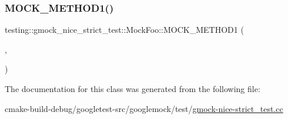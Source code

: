 \subsubsection{\texorpdfstring{MOCK\_METHOD1()}{MOCK\_METHOD1()}}
{\footnotesize\ttfamily testing\+::gmock\+\_\+nice\+\_\+strict\+\_\+test\+::\+Mock\+Foo\+::\+M\+O\+C\+K\+\_\+\+M\+E\+T\+H\+O\+D1 (\begin{DoxyParamCaption}\item[{\mbox{\hyperlink{classtesting_1_1gmock__nice__strict__test_1_1Foo_a8527a459b03f333a809a3376311a9f8b}{Do\+That}}}]{,  }\item[{int(bool flag)}]{ }\end{DoxyParamCaption})}



The documentation for this class was generated from the following file\+:\begin{DoxyCompactItemize}
\item 
cmake-\/build-\/debug/googletest-\/src/googlemock/test/\mbox{\hyperlink{gmock-nice-strict__test_8cc}{gmock-\/nice-\/strict\+\_\+test.\+cc}}\end{DoxyCompactItemize}
